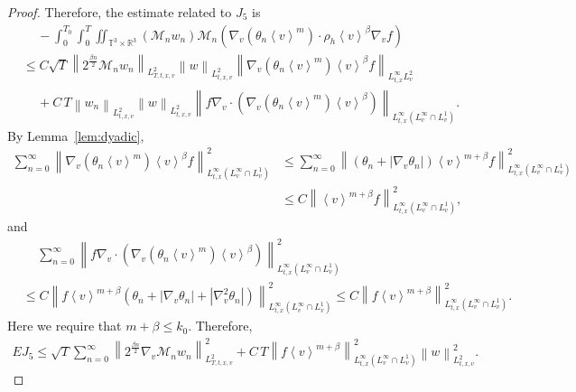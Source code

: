 \documentclass[11pt,american, reqno]{amsart}
\numberwithin{equation}{section}
\newcommand{\R}{\mathbb R}
\newcommand{\1}{\mathds{1}}
\newcommand{\CalM}{\mathcal{M}}
\newcommand{\vpran}[1]{\left(#1\right)}
\newcommand{\nn}{\nonumber}
\newcommand{\norm}[1]{\left\lVert#1\right\rVert}
\newcommand{\vint}[1]{\left\langle#1\right\rangle}
\newcommand{\T}{\mathbb{T}}
\numberwithin{equation}{section}
\begin{document}
\begin{proof}
Therefore, the estimate related to $J_5$ is
\begin{align} \label{est:J-5}
& \quad \,
 - \int_0^{T_0} \int_0^T \iint_{\T^3 \times \R^3}
   \vpran{\CalM_n w_n}
   \CalM_n \vpran{\nabla_v \vpran{\theta_n \vint{v}^m}    \cdot \rho_h \vint{v}^\beta
   \nabla_v f}  \nn
\\
& \leq
 C \sqrt{T}
 \norm{2^{\frac{\beta n}{2}}\CalM_n w_n}_{L^2_{T,t,x,v}}
 \norm{w}_{L^2_{t,x,v}}
 \norm{\nabla_v \vpran{\theta_n \vint{v}^m} \vint{v}^\beta f}_{L^\infty_{t,x}L^2_v} \nn
\\
& \quad \,
 + C \, T
 \norm{w_n}_{L^2_{t,x,v}}
 \norm{w}_{L^2_{t,x,v}}
 \norm{f \nabla_v \cdot \vpran{\nabla_v \vpran{\theta_n \vint{v}^m}    \vint{v}^\beta}}_{L^\infty_{t,x}(L^\infty_v \cap L^1_v)}. 
\end{align}
By Lemma~\ref{lem:dyadic},
\begin{align*}
 \sum_{n=0}^\infty
 \norm{\nabla_v \vpran{\theta_n \vint{v}^m} \vint{v}^\beta f}_{L^\infty_{t,x}(L^\infty_v \cap L^1_v)}^2
&\leq
 \sum_{n=0}^\infty
 \norm{\vpran{\theta_n + |\nabla_v \theta_n|} \vint{v}^{m+\beta} f}_{L^\infty_{t,x}(L^\infty_v \cap L^1_v)}^2
\\
& \leq
 C \norm{\vint{v}^{m+\beta} f}_{L^\infty_{t,x}(L^\infty_v \cap L^1_v)}^2,
\end{align*}
and
\begin{align*}
& \quad \,
 \sum_{n=0}^\infty
 \norm{f \nabla_v \cdot \vpran{\nabla_v \vpran{\theta_n \vint{v}^m}    \vint{v}^\beta}}_{L^\infty_{t,x}(L^\infty_v \cap L^1_v)}^2
\\
&\leq
 C \norm{f \vint{v}^{m+\beta} \vpran{\theta_n + |\nabla_v \theta_n| + |\nabla_v^2 \theta_n|}}_{L^\infty_{t,x}(L^\infty_v \cap L^1_v)}^2
 \leq 
 C \norm{f \vint{v}^{m+\beta}}_{L^\infty_{t,x}(L^\infty_v \cap L^1_v)}^2. 
\end{align*}
Here we require that $m + \beta \leq k_0$. Therefore,
\begin{align} \label{est:EJ-5}
 EJ_5
\leq
 \sqrt{T} \sum_{n=0}^\infty
 \norm{2^{\frac{\beta n}{2}} \nabla_v \CalM_n w_n}_{L^2_{T,t,x,v}}^2
 + C \, T 
 \norm{f \vint{v}^{m+\beta}}_{L^\infty_{t,x}(L^\infty_v \cap L^1_v)}^2
 \norm{w}_{L^2_{t,x,v}}^2. 
\end{align}


\end{proof}
\end{document}
